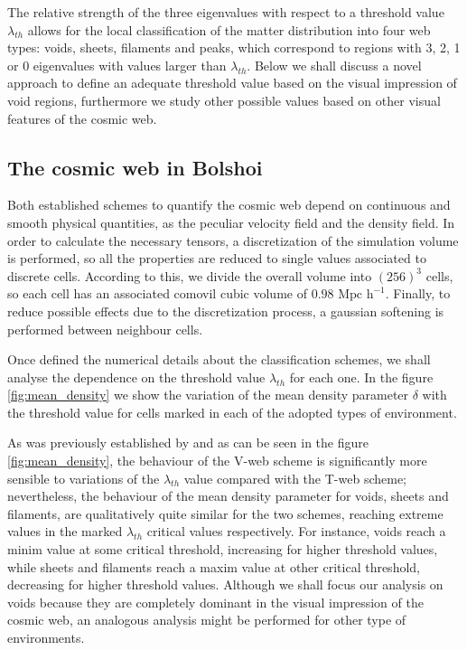 \documentclass[usenatbib]{latex/mn2e}
\begin{document}
The relative strength of the three eigenvalues with respect to a threshold
value $\lambda_{th}$ allows for the local classification of the matter 
distribution into four web types: voids, sheets, filaments and peaks, 
which correspond to regions with 3, 2, 1 or 0 eigenvalues with values 
larger than $\lambda_{th}$. Below we shall discuss a novel approach to 
define an adequate threshold value based on the visual impression of void
regions, furthermore we study other possible values based on other visual
features of the cosmic web.



\subsection{The cosmic web in Bolshoi}
\label{subsec:web_in_simulations}



Both established schemes to quantify the cosmic web depend on continuous 
and smooth physical quantities, as the peculiar velocity field and the 
density field. In order to calculate the necessary tensors, a discretization
of the simulation volume is performed, so all the properties are reduced 
to single values associated to discrete cells. According to this, we divide 
the overall volume into $(256)^3$ cells, so each cell has an associated 
comovil cubic volume of $0.98 \mbox{ Mpc h}^{-1}$. Finally, to reduce 
possible effects due to the discretization process, a gaussian softening 
is performed between neighbour cells.



Once defined the numerical details about the classification schemes, we 
shall analyse the dependence on the threshold value $\lambda_{th}$ for each 
one. In the figure \ref{fig:mean_density} we show the variation of the mean 
density parameter $\delta$ with the threshold value for cells marked in 
each of the adopted types of environment.



As was previously established by  and as 
can be seen in the figure \ref{fig:mean_density}, the behaviour of the 
V-web scheme is significantly more sensible to variations of the 
$\lambda_{th}$ value compared with the T-web scheme; nevertheless, the 
behaviour of the mean density parameter for voids, sheets and filaments, 
are qualitatively quite similar for the two schemes, reaching extreme 
values in the marked $\lambda_{th}$ critical values respectively. For 
instance, voids reach a minim value at some critical threshold, increasing 
for higher threshold values, while sheets and filaments reach a maxim value
at other critical threshold, decreasing for higher threshold values. 
Although we shall focus our analysis on voids because they are completely 
dominant in the visual impression of the cosmic web, an analogous analysis 
might be performed for other type of environments.
\end{document}
